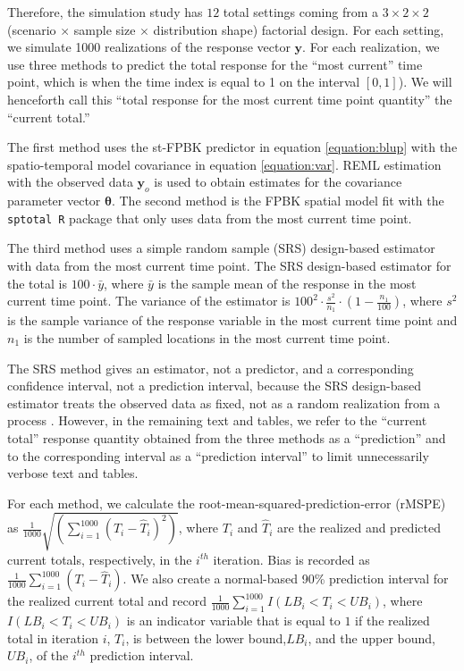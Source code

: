 \documentclass[]{interact}
\theoremstyle{plain}%
\theoremstyle{definition}
\theoremstyle{remark}
\begin{document}
Therefore, the simulation study has \(12\) total settings coming from a
\(3 \times 2 \times 2\) (scenario \(\times\) sample size \(\times\)
distribution shape) factorial design. For each setting, we simulate 1000
realizations of the response vector \(\mathbf{y}\). For each
realization, we use three methods to predict the total response for the
``most current'' time point, which is when the time index is equal to 1
on the interval \([0, 1]\)). We will henceforth call this ``total
response for the most current time point quantity'' the ``current
total.''

The first method uses the st-FPBK predictor in equation
\ref{equation:blup} with the spatio-temporal model covariance in
equation \ref{equation:var}. REML estimation with the observed data
\(\mathbf{y}_o\) is used to obtain estimates for the covariance
parameter vector \(\bm{\theta}\). The second method is the FPBK spatial
model fit with the \texttt{sptotal R} package \citep{higham2021sptotal}
that only uses data from the most current time point.

The third method uses a simple random sample (SRS) design-based
estimator with data from the most current time point. The SRS
design-based estimator for the total is \(100 \cdot \bar{y}\), where
\(\bar{y}\) is the sample mean of the response in the most current time
point. The variance of the estimator \citep{lohr2021sampling} is
\(100^2 \cdot \frac{s^2}{n_1} \cdot (1 - \frac{n_1}{100})\), where
\(s^2\) is the sample variance of the response variable in the most
current time point and \(n_1\) is the number of sampled locations in the
most current time point.

The SRS method gives an estimator, not a predictor, and a corresponding
confidence interval, not a prediction interval, because the SRS
design-based estimator treats the observed data as fixed, not as a
random realization from a process
\citep{brus2021statistical, dumelle2022comparison}. However, in the
remaining text and tables, we refer to the ``current total'' response
quantity obtained from the three methods as a ``prediction'' and to the
corresponding interval as a ``prediction interval'' to limit
unnecessarily verbose text and tables.

For each method, we calculate the root-mean-squared-prediction-error
(rMSPE) as
\(\frac{1}{1000}\sqrt{(\sum_{i = 1}^{1000}(T_i - \hat{T}_i)^2)}\), where
\(T_i\) and \(\hat{T}_i\) are the realized and predicted current totals,
respectively, in the \(i^{th}\) iteration. Bias is recorded as
\(\frac{1}{1000}\sum_{i = 1}^{1000}(T_i - \hat{T}_i)\). We also create a
normal-based 90\% prediction interval for the realized current total and
record \(\frac{1}{1000} \sum_{i = 1}^{1000}I(LB_i < T_i < UB_i)\), where
\(I(LB_i < T_i < UB_i)\) is an indicator variable that is equal to \(1\)
if the realized total in iteration \(i\), \(T_i\), is between the lower
bound,\(LB_i\), and the upper bound, \(UB_i\), of the \(i^{th}\)
prediction interval.
\end{document}

